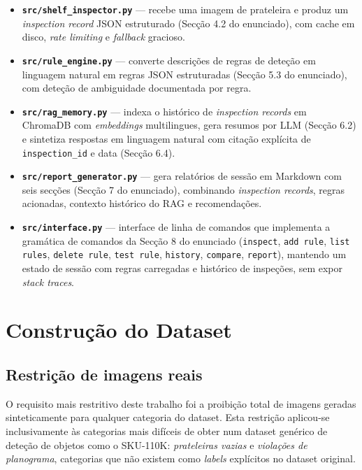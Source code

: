 \documentclass[conference]{IEEEtran}
\begin{document}
\begin{itemize}
  \item \textbf{\texttt{src/shelf\_inspector.py}} --- recebe uma imagem de
  prateleira e produz um \textit{inspection record} JSON estruturado
  (Secção 4.2 do enunciado), com cache em disco, \textit{rate limiting} e
  \textit{fallback} gracioso.
  \item \textbf{\texttt{src/rule\_engine.py}} --- converte descrições de
  regras de deteção em linguagem natural em regras JSON estruturadas
  (Secção 5.3 do enunciado), com deteção de ambiguidade documentada por
  regra.
  \item \textbf{\texttt{src/rag\_memory.py}} --- indexa o histórico de
  \textit{inspection records} em ChromaDB com \textit{embeddings}
  multilingues, gera resumos por LLM (Secção 6.2) e sintetiza respostas em
  linguagem natural com citação explícita de \texttt{inspection\_id} e data
  (Secção 6.4).
  \item \textbf{\texttt{src/report\_generator.py}} --- gera relatórios de
  sessão em Markdown com seis secções (Secção 7 do enunciado), combinando
  \textit{inspection records}, regras acionadas, contexto histórico do RAG e
  recomendações.
  \item \textbf{\texttt{src/interface.py}} --- interface de linha de
  comandos que implementa a gramática de comandos da Secção 8 do enunciado
  (\texttt{inspect}, \texttt{add rule}, \texttt{list rules},
  \texttt{delete rule}, \texttt{test rule}, \texttt{history},
  \texttt{compare}, \texttt{report}), mantendo um estado de sessão com
  regras carregadas e histórico de inspeções, sem expor \textit{stack
  traces}.
\end{itemize}

\section{Construção do Dataset}
\label{sec:dataset}

\subsection{Restrição de imagens reais}

O requisito mais restritivo deste trabalho foi a proibição total de imagens
geradas sinteticamente para qualquer categoria do dataset. Esta restrição
aplicou-se inclusivamente às categorias mais difíceis de obter num dataset
genérico de deteção de objetos como o SKU-110K: \textit{prateleiras vazias}
e \textit{violações de planograma}, categorias que não existem como
\textit{labels} explícitos no dataset original.
\end{document}
